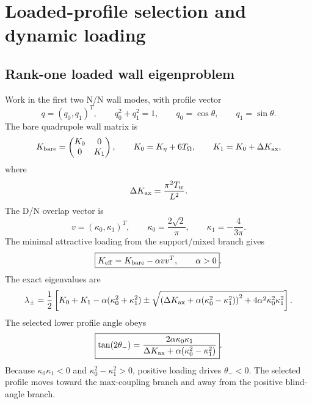 \section{Loaded-profile selection and dynamic loading}
\label{sec:part02_conservative_response:loaded-profile-selection-and-dynamic-loading}

\subsection{Rank-one loaded wall eigenproblem}
\label{subsec:part02-stage028-loaded-wall}

Work in the first two N/N wall modes, with profile vector
\begin{equation}
q=(q_0,q_1)^T,
\qquad
q_0^2+q_1^2=1,
\qquad
q_0=\cos\theta,
\qquad
q_1=\sin\theta.
\end{equation}
The bare quadrupole wall matrix is
\begin{equation}
\label{eq:part02-Kbare}
K_{\rm bare}=\begin{pmatrix}K_0&0\\0&K_1\end{pmatrix},
\qquad
K_0=K_\eta+6T_\Omega,
\qquad
K_1=K_0+\Delta K_{\rm ax},
\end{equation}
where
\begin{equation}
\Delta K_{\rm ax}=\frac{\pi^2T_w}{L^2}.
\end{equation}
The D/N overlap vector is
\begin{equation}
\label{eq:part02-v-vector}
\boxed{
v=(\kappa_0,\kappa_1)^T,
\qquad
\kappa_0=\frac{2\sqrt2}{\pi},
\qquad
\kappa_1=-\frac{4}{3\pi}}.
\end{equation}
The minimal attractive loading from the support/mixed branch gives
\begin{equation}
\label{eq:part02-Keff-alpha}
\boxed{
K_{\rm eff}=K_{\rm bare}-\alpha vv^T,
\qquad
\alpha>0}.
\end{equation}
The exact eigenvalues are
\begin{equation}
\label{eq:part02-stage11-eigenvalues}
\lambda_\pm
=
\frac12\left[
K_0+K_1-\alpha(\kappa_0^2+\kappa_1^2)
\pm
\sqrt{\left(\Delta K_{\rm ax}+\alpha(\kappa_0^2-\kappa_1^2)\right)^2+4\alpha^2\kappa_0^2\kappa_1^2}
\right].
\end{equation}
The selected lower profile angle obeys
\begin{equation}
\label{eq:part02-stage11-angle-law}
\boxed{
\tan(2\theta_-)
=
\frac{2\alpha\kappa_0\kappa_1}
{\Delta K_{\rm ax}+\alpha(\kappa_0^2-\kappa_1^2)}}.
\end{equation}
Because \(\kappa_0\kappa_1<0\) and \(\kappa_0^2-\kappa_1^2>0\), positive loading drives \(\theta_-<0\).  The selected profile moves toward the max-coupling branch and away from the positive blind-angle branch.

